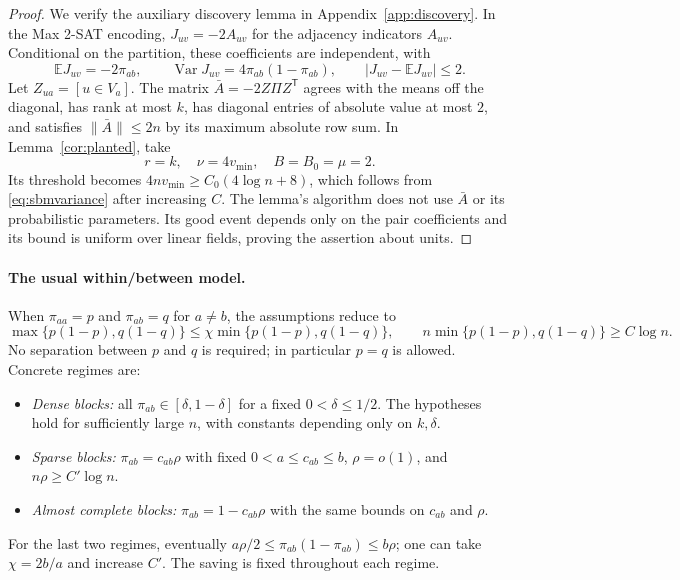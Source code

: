 \documentclass[11pt,a4paper]{article}
\theoremstyle{definition}
\theoremstyle{remark}
\newcommand{\E}{\mathbb E}
\begin{document}
\begin{proof}
We verify the auxiliary discovery lemma in
Appendix~\ref{app:discovery}. In the Max 2-SAT encoding,
$J_{uv}=-2A_{uv}$ for the adjacency indicators $A_{uv}$. Conditional on
the partition, these coefficients are independent, with
\[
 \E J_{uv}=-2\pi_{ab},\qquad
 \operatorname{Var}J_{uv}=4\pi_{ab}(1-\pi_{ab}),\qquad
 |J_{uv}-\E J_{uv}|\le2.
\]
Let $Z_{ua}=[u\in V_a]$. The matrix
$\bar A=-2Z\Pi Z^{\mathsf T}$ agrees with the means off the diagonal,
has rank at most $k$, has diagonal entries of absolute value at most $2$,
and satisfies $\|\bar A\|\le2n$ by its maximum absolute row sum.
In Lemma~\ref{cor:planted}, take
\[
 r=k,\quad \nu=4v_{\min},\quad B=B_0=\mu=2.
\]
Its threshold becomes
$4n v_{\min}\ge C_0(4\log n+8)$, which follows from
\eqref{eq:sbmvariance} after increasing $C$.
The lemma's algorithm does not use $\bar A$ or its probabilistic
parameters. Its good event depends only on the pair coefficients and its
bound is uniform over linear fields, proving the assertion about units.
\end{proof}

\paragraph{The usual within/between model.}
When $\pi_{aa}=p$ and $\pi_{ab}=q$ for $a\ne b$, the assumptions reduce to
\[
 \max\{p(1-p),q(1-q)\}\le\chi\min\{p(1-p),q(1-q)\},\qquad
 n\min\{p(1-p),q(1-q)\}\ge C\log n.
\]
No separation between $p$ and $q$ is required; in particular $p=q$ is
allowed. Concrete regimes are:
\begin{itemize}
\item \emph{Dense blocks:} all $\pi_{ab}\in[\delta,1-\delta]$ for a
fixed $0<\delta\le1/2$. The hypotheses hold for sufficiently large $n$,
with constants depending only on $k,\delta$.
\item \emph{Sparse blocks:} $\pi_{ab}=c_{ab}\rho$ with fixed
$0<a\le c_{ab}\le b$, $\rho=o(1)$, and $n\rho\ge C'\log n$.
\item \emph{Almost complete blocks:} $\pi_{ab}=1-c_{ab}\rho$ with the
same bounds on $c_{ab}$ and $\rho$.
\end{itemize}
For the last two regimes, eventually
$a\rho/2\le\pi_{ab}(1-\pi_{ab})\le b\rho$; one can take
$\chi=2b/a$ and increase $C'$. The saving is fixed throughout each regime.
\end{document}
